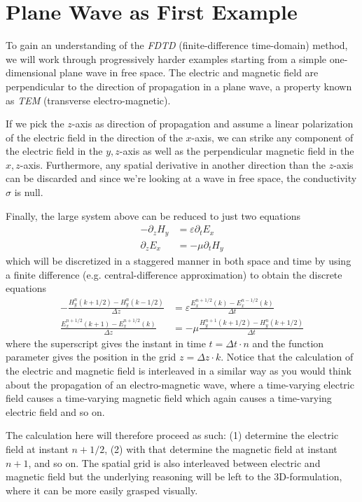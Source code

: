 \documentclass[]{report}
\begin{document}
\section{Plane Wave as First Example}
To gain an understanding of the \textit{FDTD} (finite-difference time-domain) method, we will work through progressively harder examples starting from a simple one-dimensional plane wave in free space. The electric and magnetic field are perpendicular to the direction of propagation in a plane wave, a property known as \textit{TEM} (transverse electro-magnetic).

If we pick the \(z\)-axis as direction of propagation and assume a linear polarization of the electric field in the direction of the \(x\)-axis, we can strike any component of the electric field in the \(y,z\)-axis as well as the perpendicular magnetic field in the \(x,z\)-axis. Furthermore, any spatial derivative in another direction than the \(z\)-axis can be discarded and since we're looking at a wave in free space, the conductivity \( \sigma \) is null.

Finally, the large system above can be reduced to just two equations
\begin{align}
	-\partial_z H_y &= \varepsilon \partial_t E_x \\
	\partial_z E_x  &= -\mu \partial_t H_y
\end{align}
which will be discretized in a staggered manner in both space and time by using a finite difference (e.g. central-difference approximation)
to obtain the discrete equations
\begin{align}
	-\frac{H_y^{n}(k+1/2) - H_y^n(k-1/2)}{\Delta z} &= \varepsilon \frac{E_x^{n+1/2}(k)-E_x^{n-1/2}(k)}{\Delta t} \\
	\frac{E_x^{n+1/2}(k+1)-E_x^{n+1/2}(k)}{\Delta z}  &= -\mu \frac{H_y^{n+1}(k+1/2)-H_y^{n}(k+1/2)}{\Delta t}
\end{align}
where the superscript gives the instant in time \( t = \Delta t \cdot n \) and the function parameter gives the position in the grid \( z = \Delta z \cdot k \). Notice that the calculation of the electric and magnetic field is interleaved in a similar way as you would think about the propagation of an electro-magnetic wave, where a time-varying electric field causes a time-varying magnetic field which again causes a time-varying electric field and so on.

The calculation here will therefore proceed as such: (1) determine the electric field at instant \( n+1/2 \), (2) with that determine the magnetic field at instant \( n+1 \), and so on. The spatial grid is also interleaved between electric and magnetic field but the underlying reasoning will be left to the 3D-formulation, where it can be more easily grasped visually.
\end{document}

